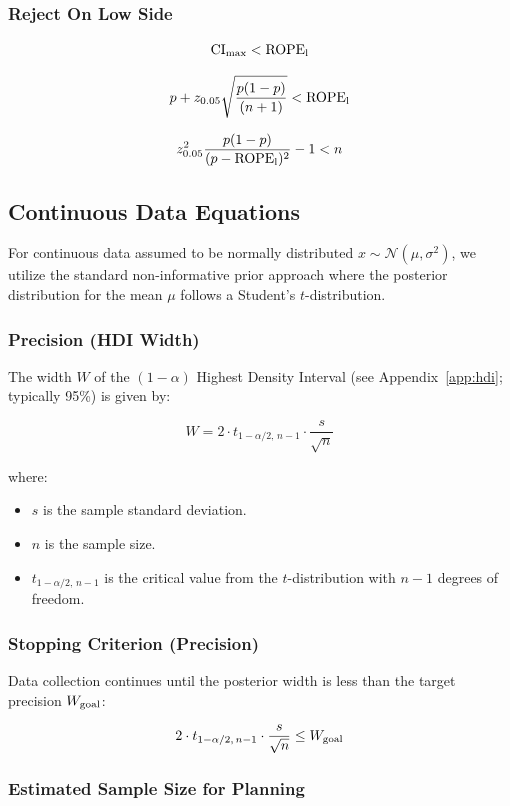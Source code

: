 \subsubsection{Reject On Low Side}

$${\rm CI}_{\rm max} < {\rm ROPE}_{\rm l}$$


$$p + z_{0.05} \sqrt{\frac{p(1-p)}{(n+1)}} < {\rm ROPE}_{\rm l}$$

$$z_{0.05}^2 \frac{p(1-p)}{ ( p - {\rm ROPE}_{\rm l})^2}- 1 < n$$

\subsection{Continuous Data Equations}

For continuous data assumed to be normally distributed $x \sim \mathcal{N}(\mu, \sigma^2)$, we utilize the standard non-informative prior approach where the posterior distribution for the mean $\mu$ follows a Student's $t$-distribution.

\subsubsection{Precision (HDI Width)}

The width $W$ of the $(1-\alpha)$ Highest Density Interval
(see Appendix~\ref{app:hdi}; typically 95\%) is given by:

$$ W = 2 \cdot t_{1-\alpha/2, \, n-1} \cdot \frac{s}{\sqrt{n}} $$

where:
\begin{itemize}
    \item $s$ is the sample standard deviation.
    \item $n$ is the sample size.
    \item $t_{1-\alpha/2, \, n-1}$ is the critical value from the $t$-distribution with $n-1$ degrees of freedom.
\end{itemize}

\subsubsection{Stopping Criterion (Precision)}

Data collection continues until the posterior width is less than the target precision $W_{\rm goal}$:

$$ 2 \cdot t_{1-\alpha/2, \, n-1} \cdot \frac{s}{\sqrt{n}} \leq W_{\rm goal} $$

\subsubsection{Estimated Sample Size for Planning}

